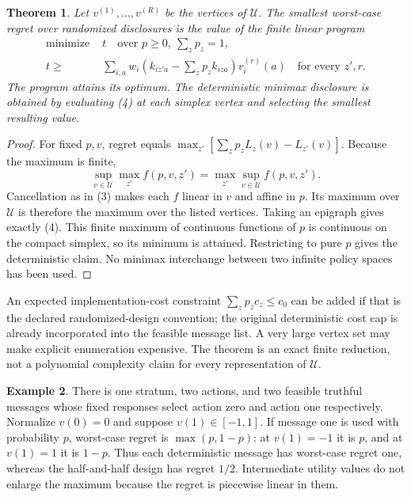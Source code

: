 \documentclass[11pt]{article}
\newtheorem{theorem}{Theorem}
\theoremstyle{definition}
\newtheorem{example}[theorem]{Example}
\begin{document}
\begin{theorem}
Let $v^{(1)},\ldots,v^{(R)}$ be the vertices of $\mathcal U$. The
smallest worst-case regret over randomized disclosures is the value of
the finite linear program
\[
 \begin{split}
 \text{minimize }&t\quad\text{over }p\ge0,\ \sum_zp_z=1,\\
 t\ge&\sum_{i,a}w_i\left(k_{iz'a}-\sum_zp_zk_{iza}\right)
                     v_i^{(r)}(a)
       \quad\text{for every }z',r.
 \end{split}                                           \tag{4}
\]
The program attains its optimum. The deterministic minimax disclosure
is obtained by evaluating (4) at each simplex vertex and selecting the
smallest resulting value.
\end{theorem}
\begin{proof}
For fixed $p,v$, regret equals
$\max_{z'}[\sum_zp_zL_z(v)-L_{z'}(v)]$.
Because the maximum is finite,
\[
 \sup_{v\in\mathcal U}\max_{z'} f(p,v,z')
 =\max_{z'}\sup_{v\in\mathcal U}f(p,v,z').
\]
Cancellation as in (3) makes each $f$ linear in $v$ and affine in $p$.
Its maximum over $\mathcal U$ is therefore the maximum over the listed
vertices. Taking an epigraph gives exactly (4). This finite maximum of
continuous functions of $p$ is continuous on the compact simplex, so
its minimum is attained. Restricting to pure $p$ gives the deterministic
claim. No minimax interchange between two infinite policy spaces has
been used.
\end{proof}
An expected implementation-cost constraint $\sum_zp_zc_z\le c_0$
can be added if that is the declared randomized-design convention; the
original deterministic cost cap is already incorporated into the feasible
message list. A very large vertex set may make explicit enumeration
expensive. The theorem is an exact finite reduction, not a polynomial
complexity claim for every representation of $\mathcal U$.

\begin{example}
There is one stratum, two actions, and two feasible truthful messages
whose fixed responses select action zero and action one respectively.
Normalize $v(0)=0$ and suppose $v(1)\in[-1,1]$. If message one is
used with probability $p$, worst-case regret is
$\max(p,1-p)$: at $v(1)=-1$ it is $p$, and at $v(1)=1$ it is $1-p$.
Thus each deterministic message has worst-case regret one, whereas the
half-and-half design has regret $1/2$. Intermediate utility values do
not enlarge the maximum because the regret is piecewise linear in them.
\end{example}
\end{document}
